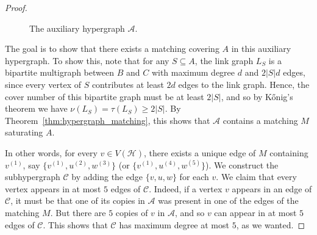 \documentclass[11pt, a4paper]{article}
\numberwithin{theorem}{section} %
\theoremstyle{remark}
\theoremstyle{definition}
\def\cA{\mathcal{A}}
\def\cC{\mathcal{C}}
\def\cH{\mathcal{H}}
\begin{document}
\begin{proof}
\begin{figure}[hbpt!]
\begin{center}
\end{center}

\caption{The auxiliary hypergraph $\cA$.}
\label{fig:auxiliary}
\end{figure}


The goal is to show that there exists a matching covering $A$ in this auxiliary hypergraph. To show this, note that for any $S\subseteq A$, the link graph $L_S$ is a bipartite multigraph between $B$ and $C$ with maximum degree $d$ and $2|S|d$ edges, since every vertex of $S$ contributes at least $2d$ edges to the link graph. Hence, the cover number of this bipartite graph must be at least $2|S|$, and so by K\H{o}nig's theorem we have $\nu(L_S)=\tau(L_S)\geq 2|S|$. By Theorem~\ref{thm:hypergraph_matching}, this shows that $\cA$ contains a matching $M$ saturating $A$.

In other words, for every $v\in V(\cH)$, there exists a unique edge of $M$ containing $v^{(1)}$, say $\{v^{(1)}, u^{(2)}, w^{(3)}\}$ (or $\{v^{(1)}, u^{(4)}, w^{(5)}\}$). We construct the subhypergraph $\cC$ by adding the edge $\{v, u, w\}$ for each $v$. We claim that every vertex appears in at most $5$ edges of $\cC$. Indeed, if a vertex $v$ appears in an edge of $\cC$, it must be that one of its copies in $\cA$ was present in one of the edges of the matching $M$. But there are $5$ copies of $v$ in $\cA$, and so $v$ can appear in at most $5$ edges of $\cC$. This shows that $\cC$ has maximum degree at most $5$, as we wanted. 
\end{proof}
\end{document}
